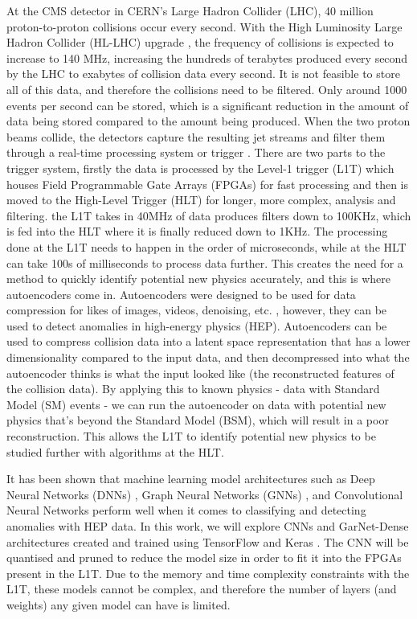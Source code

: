 \documentclass[a4paper]{article}
\theoremstyle{plain}
\theoremstyle{definition}
\begin{document}
	At the CMS detector in CERN's Large Hadron Collider (LHC), 40 million proton-to-proton collisions occur every second. With the High Luminosity Large Hadron Collider (HL-LHC) upgrade \cite{hl-lhc}, the frequency of collisions is expected to increase to 140 MHz, increasing the hundreds of terabytes produced every second by the LHC to exabytes of collision data every second. It is not feasible to store all of this data, and therefore the collisions need to be filtered. Only around 1000 events per second can be stored, which is a significant reduction in the amount of data being stored compared to the amount being produced. When the two proton beams collide, the detectors capture the resulting jet streams and filter them through a real-time processing system or trigger \cite{trigger-system}. There are two parts to the trigger system, firstly the data is processed by the Level-1 trigger (L1T) which houses Field Programmable Gate Arrays (FPGAs) for fast processing and then is moved to the High-Level Trigger (HLT) for longer, more complex, analysis and filtering. the L1T takes in 40MHz of data produces filters down to 100KHz, which is fed into the HLT where it is finally reduced down to 1KHz. The processing done at the L1T needs to happen in the order of microseconds, while at the HLT can take 100s of milliseconds to process data further. This creates the need for a method to quickly identify potential new physics accurately, and this is where autoencoders come in. Autoencoders \cite{autoencoders} were designed to be used for data compression for likes of images, videos, denoising, etc. \cite{image-autoencoder}, however, they can be used to detect anomalies in high-energy physics (HEP). Autoencoders can be used to compress collision data into a latent space representation that has a lower dimensionality compared to the input data, and then decompressed into what the autoencoder thinks is what the input looked like (the reconstructed features of the collision data). By applying this to known physics - data with Standard Model (SM) events - we can run the autoencoder on data with potential new physics that's beyond the Standard Model (BSM), which will result in a poor reconstruction. This allows the L1T to identify potential new physics to be studied further with algorithms at the HLT.
	
	It has been shown that machine learning model architectures such as Deep Neural Networks (DNNs) \cite{dnn}, Graph Neural Networks (GNNs) \cite{garnet, garnet2}, and Convolutional Neural Networks \cite{katya} perform well when it comes to classifying and detecting anomalies with HEP data.  In this work, we will explore CNNs and GarNet-Dense architectures created and trained using TensorFlow \cite{tensorflow} and Keras \cite{keras}. The CNN will be quantised and pruned to reduce the model size in order to fit it into the FPGAs present in the L1T. Due to the memory and time complexity constraints with the L1T, these models cannot be complex, and therefore the number of layers (and weights) any given model can have is limited. 
	
\end{document}
